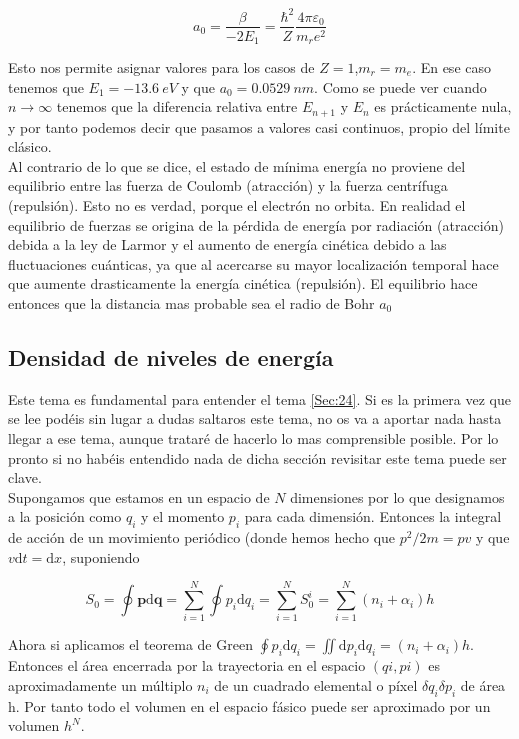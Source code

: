 \documentclass[12pt,a4paper]{article}
\numberwithin{equation}{section}
\numberwithin{figure}{section}
\newcommand{\D}{\mathrm{d}}
\newcommand{\pn}{\mathbf{p}}
\newcommand{\qn}{\mathbf{q}}
\begin{document}
\begin{equation}
a_0 = \dfrac{\beta}{- 2 E_1} = \dfrac{\hbar^2}{Z} \dfrac{4 \pi \varepsilon_0}{m_r e^2}
\end{equation}

Esto nos permite asignar valores para los casos de $Z=1$,$m_r = m_e$. En ese caso tenemos que $E_1 = -13.6 \ eV$ y que $a_0 = 0.0529 \ nm$. Como se puede ver cuando $n \rightarrow \infty$ tenemos que la diferencia relativa entre $E_{n+1}$ y $E_n$ es prácticamente nula, y por tanto podemos decir que pasamos a valores casi continuos, propio del límite clásico. \\

Al contrario de lo que se dice, el estado de mínima energía no proviene del equilibrio entre las fuerza de Coulomb (atracción) y la fuerza centrífuga (repulsión). Esto no es verdad, porque el electrón no orbita. En realidad el equilibrio de fuerzas se origina de la pérdida de energía por radiación (atracción) debida a la ley de Larmor y el aumento de energía cinética debido a las fluctuaciones cuánticas, ya que al acercarse su mayor localización temporal hace que aumente drasticamente la energía cinética (repulsión). El equilibrio hace entonces que la distancia mas probable sea el radio de Bohr $a_0$   \\

\subsection{Densidad de niveles de energía}

Este tema es fundamental para entender el tema \ref{Sec:24}. Si es la primera vez que se lee podéis sin lugar a dudas saltaros este tema, no os va a aportar nada hasta llegar a ese tema, aunque trataré de hacerlo lo mas comprensible posible. Por lo pronto si no habéis entendido nada de dicha sección revisitar este tema puede ser clave. \\

Supongamos que estamos en un espacio de $N$ dimensiones por lo que designamos a la posición como $q_i$ y el momento $p_i$ para cada dimensión. Entonces la integral de acción de un movimiento periódico  (donde hemos hecho que $p^2 /2m = p v$ y que $v \D t = \D x$, suponiendo 

$$ S_0 = \oint  \pn \D \qn = \sum_{i=1}^N \oint p_i \D q_i = \sum_{i=1}^N S_0^i = \sum_{i=1}^N (n_i + \alpha_i) h $$

Ahora si aplicamos el teorema de Green $\oint p_i \D q_i = \iint \D p_i \D q_i = (n_i + \alpha_i) h$. Entonces el área encerrada por la trayectoria en el espacio $(qi, pi)$ es aproximadamente un múltiplo $n_i$ de un cuadrado elemental o píxel $\delta q_i \delta p_i$ de área h. Por tanto todo el volumen en el espacio fásico puede ser aproximado por un volumen $h^N$.  \\
\end{document}
